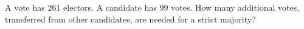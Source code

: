 A vote has $261$ electors. A candidate has $99$ votes. How many additional votes, transferred from other candidates, are needed for a strict majority?

